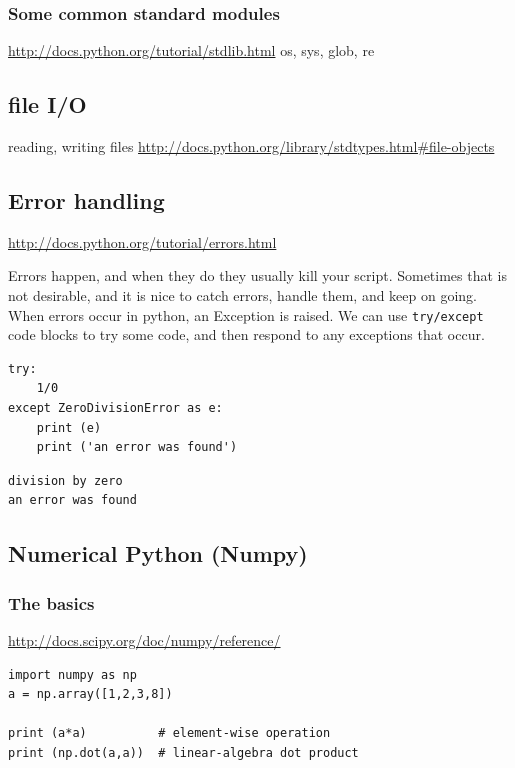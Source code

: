 \documentclass[11pt]{article}
\begin{document}
\subsubsection{Some common standard modules}
\label{sec:org3cebe85}
\url{http://docs.python.org/tutorial/stdlib.html}
os, sys, glob,  re


\subsection{file I/O}
\label{sec:orgd28dd6c}
reading, writing files
\url{http://docs.python.org/library/stdtypes.html\#file-objects}


\subsection{Error handling}
\label{sec:orgf9fc650}
\url{http://docs.python.org/tutorial/errors.html}

Errors happen, and when they do they usually kill your script. Sometimes that is not desirable, and it is nice to catch errors, handle them, and keep on going. When errors occur in python, an Exception is raised. We can use \texttt{try/except} code blocks to try some code, and then respond to any exceptions that occur.

\begin{verbatim}
try:
    1/0
except ZeroDivisionError as e:
    print (e)
    print ('an error was found')
\end{verbatim}

\begin{verbatim}
division by zero
an error was found
\end{verbatim}


\subsection{Numerical Python (Numpy)}
\label{sec:org254f792}

\subsubsection{The basics}
\label{sec:org169cc9a}
\url{http://docs.scipy.org/doc/numpy/reference/}

\begin{verbatim}
import numpy as np
a = np.array([1,2,3,8])

print (a*a)          # element-wise operation
print (np.dot(a,a))  # linear-algebra dot product
\end{verbatim}
\end{document}
